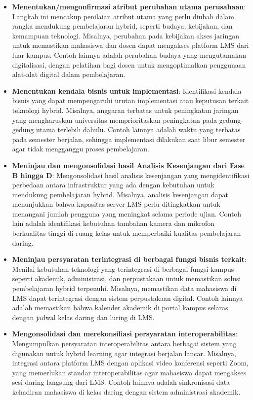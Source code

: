 \begin{itemize}
	\item \textbf{Menentukan/mengonfirmasi atribut perubahan utama perusahaan}: Langkah ini mencakup penilaian atribut utama yang perlu diubah dalam rangka mendukung pembelajaran hybrid, seperti budaya, kebijakan, dan kemampuan teknologi. Misalnya, perubahan pada kebijakan akses jaringan untuk memastikan mahasiswa dan dosen dapat mengakses platform LMS dari luar kampus. Contoh lainnya adalah perubahan budaya yang mengutamakan digitalisasi, dengan pelatihan bagi dosen untuk mengoptimalkan penggunaan alat-alat digital dalam pembelajaran.
	
	\item \textbf{Menentukan kendala bisnis untuk implementasi}: Identifikasi kendala bisnis yang dapat mempengaruhi urutan implementasi atau keputusan terkait teknologi hybrid. Misalnya, anggaran terbatas untuk peningkatan jaringan yang mengharuskan universitas memprioritaskan peningkatan pada gedung-gedung utama terlebih dahulu. Contoh lainnya adalah waktu yang terbatas pada semester berjalan, sehingga implementasi dilakukan saat libur semester agar tidak mengganggu proses pembelajaran.
	
	\item \textbf{Meninjau dan mengonsolidasi hasil Analisis Kesenjangan dari Fase B hingga D}: Mengonsolidasi hasil analisis kesenjangan yang mengidentifikasi perbedaan antara infrastruktur yang ada dengan kebutuhan untuk mendukung pembelajaran hybrid. Misalnya, analisis kesenjangan dapat menunjukkan bahwa kapasitas server LMS perlu ditingkatkan untuk menangani jumlah pengguna yang meningkat selama periode ujian. Contoh lain adalah identifikasi kebutuhan tambahan kamera dan mikrofon berkualitas tinggi di ruang kelas untuk memperbaiki kualitas pembelajaran daring.
	
	\item \textbf{Meninjau persyaratan terintegrasi di berbagai fungsi bisnis terkait}: Menilai kebutuhan teknologi yang terintegrasi di berbagai fungsi kampus seperti akademik, administrasi, dan perpustakaan untuk memastikan solusi pembelajaran hybrid terpenuhi. Misalnya, memastikan data mahasiswa di LMS dapat terintegrasi dengan sistem perpustakaan digital. Contoh lainnya adalah memastikan bahwa kalender akademik di portal kampus selaras dengan jadwal kelas daring dan luring di LMS.
	
	\item \textbf{Mengonsolidasi dan merekonsiliasi persyaratan interoperabilitas}: Mengumpulkan persyaratan interoperabilitas antara berbagai sistem yang digunakan untuk hybrid learning agar integrasi berjalan lancar. Misalnya, integrasi antara platform LMS dengan aplikasi video konferensi seperti Zoom, yang memerlukan standar interoperabilitas agar mahasiswa dapat mengakses sesi daring langsung dari LMS. Contoh lainnya adalah sinkronisasi data kehadiran mahasiswa di kelas daring dengan sistem administrasi akademik.
	

\end{itemize}
